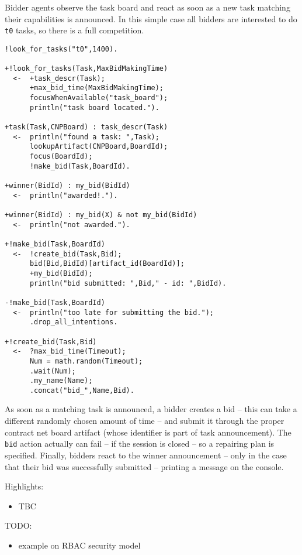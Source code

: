 \documentclass[11pt]{report}
\newcommand\code[1]{{\small{\mbox{\texttt{{#1}}}}}}
\begin{document}
\medskip

Bidder agents observe the task board and react as soon as a new task matching their capabilities is announced.
%
In this simple case all bidders are interested to do \code{t0} tasks, so there is a full competition.
%

{\small{\begin{verbatim}
!look_for_tasks("t0",1400).

+!look_for_tasks(Task,MaxBidMakingTime) 
  <-  +task_descr(Task);
      +max_bid_time(MaxBidMakingTime);
      focusWhenAvailable("task_board");
      println("task board located.").
  
+task(Task,CNPBoard) : task_descr(Task)
  <-  println("found a task: ",Task);
      lookupArtifact(CNPBoard,BoardId);
      focus(BoardId);
      !make_bid(Task,BoardId).
    
+winner(BidId) : my_bid(BidId)
  <-  println("awarded!.").

+winner(BidId) : my_bid(X) & not my_bid(BidId)
  <-  println("not awarded.").
  
+!make_bid(Task,BoardId)
  <-  !create_bid(Task,Bid);
      bid(Bid,BidId)[artifact_id(BoardId)];
      +my_bid(BidId);
      println("bid submitted: ",Bid," - id: ",BidId).

-!make_bid(Task,BoardId)
  <-  println("too late for submitting the bid.");
      .drop_all_intentions.
  
+!create_bid(Task,Bid) 
  <-  ?max_bid_time(Timeout); 
      Num = math.random(Timeout);
      .wait(Num);
      .my_name(Name);
      .concat("bid_",Name,Bid).
 \end{verbatim}}}

\noindent As soon as a matching task is announced, a bidder creates a bid -- this can take a different randomly chosen amount of time -- and submit it through the proper contract net board artifact (whose identifier is part of task announcement).
%
The \code{bid} action actually can fail -- if the session is closed -- so a repairing plan is specified.
%
Finally, bidders react to the winner announcement -- only in the case that their bid was successfully submitted --  printing  a message on the console.

\medskip

\noindent Highlights:
%
\begin{itemize}
%
\item TBC
%
\end{itemize}


\newpage

\noindent TODO:
\begin{itemize}
\item example on RBAC security model
\end{itemize}
\end{document}
